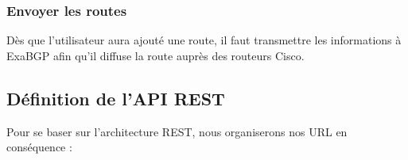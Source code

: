 \subsubsection{Envoyer les routes}
Dès que l'utilisateur aura ajouté une route, il faut transmettre les informations à ExaBGP afin qu'il diffuse la route auprès des routeurs Cisco.



\subsection{Définition de l'API REST}
Pour se baser sur l'architecture REST, nous organiserons nos URL en conséquence :


